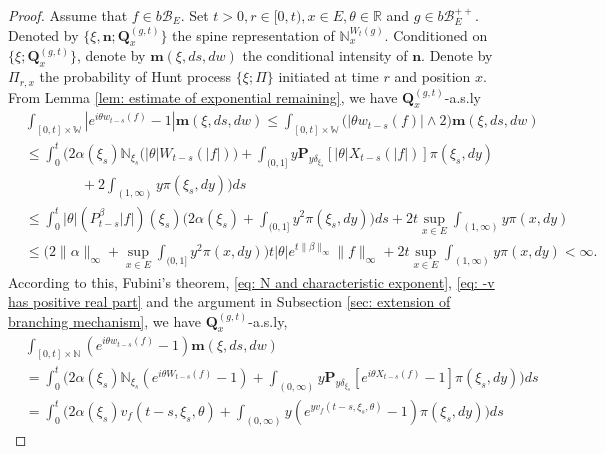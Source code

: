 \documentclass[12pt, a4paper]{amsart}
\theoremstyle{definition}
\numberwithin{equation}{section}
\begin{document}
\begin{proof}
    Assume that $f\in b\mathscr B_E$.
	Set $t>0, r\in [0,t), x\in E, \theta \in \mathbb R$ and $g\in b\mathscr B_E^{++}$.
	Denoted by $\{\xi, \mathbf n; \mathbf Q_x^{(g,t)}\}$ the spine representation of $\mathbb N_x^{W_t(g)}$.
    Conditioned on $\{\xi; \mathbf Q_x^{(g,t)}\}$, denote by $\mathbf m(\xi, ds,dw)$ the conditional intensity of $\mathbf n$.
    Denote by $\Pi_{r,x}$ the probability of Hunt process $\{\xi; \Pi\}$ initiated at time $r$ and position $x$.
    From Lemma \ref{lem: estimate of exponential remaining}, we have $\mathbf Q^{(g,t)}_{x}$-a.s.ly
\begin{align}
&\int_{[0,t]\times \mathbb W}|e^{i\theta w_{t-s}(f)} - 1| \mathbf m(\xi, ds,dw)
    \leq \int_{[0,t]\times \mathbb W}\big(|\theta w_{t-s}(f)| \wedge 2\big) \mathbf m(\xi, ds,dw)
    \\&\leq \int_0^t \Big(2\alpha(\xi_s)\mathbb N_{\xi_s}\big(|\theta | W_{t-s}(|f|)\big)  + \int_{(0,1]} y \mathbf P_{y \delta_{\xi_s}}[|\theta| X_{t-s}(|f|)] \pi(\xi_s,dy)
    \\&\qquad\qquad+ 2\int_{(1,\infty)}y\pi(\xi_s,dy)\Big) ds
     \\&\leq \int_0^t |\theta|(P_{t-s}^\beta |f|)(\xi_s)\Big(2\alpha(\xi_s)  + \int_{(0,1]} y^2 \pi(\xi_s,dy)\Big) ds + 2t \sup_{x\in E}\int_{(1,\infty)}y\pi(x,dy)
    \\&\leq \Big(2\|\alpha\|_\infty +\sup_{x\in E}\int_{(0,1]} y^2 \pi(x,dy)\Big) t |\theta| e^{t\|\beta\|_\infty}\|f\|_\infty + 2t \sup_{x\in E}\int_{(1,\infty)}y\pi(x,dy)
    < \infty.
\end{align}
    According to this, Fubini's theorem, \eqref{eq: N and characteristic exponent}, \eqref{eq: -v has positive real part} and the argument in Subsection \ref{sec: extension of branching mechanism}, we have $\mathbf Q^{(g,t)}_{x}$-a.s.ly,
\begin{align}
	&\int_{[0,t]\times \mathbb N}(e^{i\theta w_{t-s}(f)} - 1) \mathbf m(\xi, ds,dw)
	\\&=\int_0^t \Big(2\alpha(\xi_s)\mathbb N_{\xi_s}(e^{i\theta W_{t-s}(f)} - 1)  + \int_{(0,\infty)} y \mathbf P_{y \delta_{\xi_s}}[e^{i\theta X_{t-s}(f)} - 1] \pi(\xi_s,dy)\Big) ds
    \\&=\int_0^t \Big( 2\alpha(\xi_s) v_f(t-s,\xi_s,\theta) + \int_{(0,\infty)} y (e^{y v_f(t-s,\xi_s,\theta)} - 1) \pi(\xi_s,dy) \Big) ds

\end{align}
\end{proof}
\end{document}
